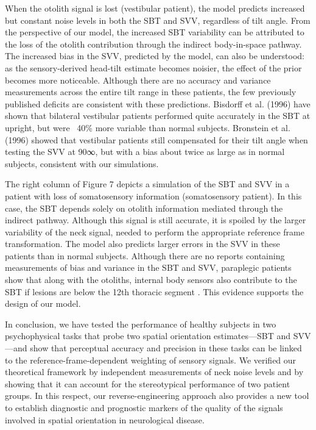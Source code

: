 When the otolith signal is lost (vestibular patient), the model predicts increased but constant noise levels in both the SBT and SVV, regardless of tilt angle. From the perspective of our model, the increased SBT variability can be attributed to the loss of the otolith contribution through the indirect body-in-space pathway. The increased bias in the SVV, predicted by the model, can also be understood: as the sensory-derived head-tilt estimate becomes noisier, the effect of the prior becomes more noticeable. Although there are no accuracy and variance measurements across the entire tilt range in these patients, the few previously published deficits are consistent with these predictions. Bisdorff et al. (1996) have shown that bilateral vestibular patients performed quite accurately in the SBT at upright, but were ~40\% more variable than normal subjects. Bronstein et al. (1996) showed that vestibular patients still compensated for their tilt angle when testing the SVV at 90∞, but with a bias about twice as large as in normal subjects, consistent with our simulations. 

The right column of Figure 7 depicts a simulation of the SBT and SVV in a patient with loss of somatosensory information (somatosensory patient). In this case, the SBT depends solely on otolith information mediated through the indirect pathway. Although this signal is still accurate, it is spoiled by the larger variability of the neck signal, needed to perform the appropriate reference frame transformation. The model also predicts larger errors in the SVV in these patients than in normal subjects. Although there are no reports containing measurements of bias and variance in the SBT and SVV, paraplegic patients show that along with the otoliths, internal body sensors also contribute to the SBT if lesions are below the 12th thoracic segment \cite{mittelstaedt1997}. This evidence supports the design of our model. 

In conclusion, we have tested the performance of healthy subjects in two psychophysical tasks that probe two spatial orientation estimates---SBT and SVV---and show that perceptual accuracy and precision in these tasks can be linked to the reference-frame-dependent weighting of sensory signals. We verified our theoretical framework by independent measurements of neck noise levels and by showing that it can account for the stereotypical performance of two patient groups. In this respect, our reverse-engineering approach also provides a new tool to establish diagnostic and prognostic markers of the quality of the signals involved in spatial orientation in neurological disease. 

